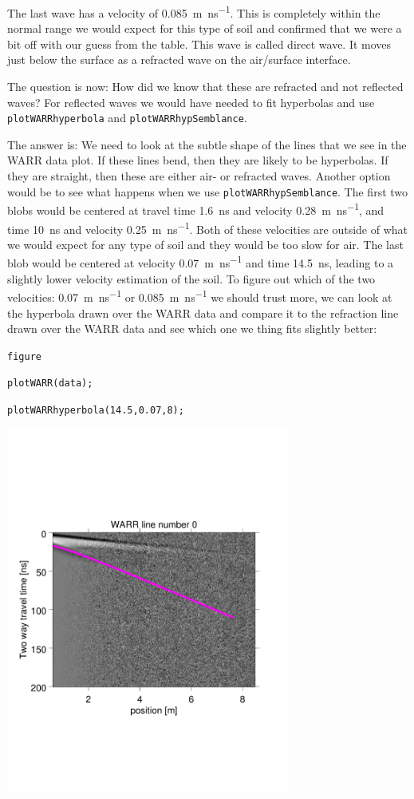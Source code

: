 \documentclass[11pt]{article}
\begin{document}
The last wave has a velocity of \SI{0.085}{m\per\ns}. This is
completely within the normal range we would expect for this type of
soil and confirmed that we were a bit off with our guess from the
table. This wave is called direct wave. It moves just below the
surface as a refracted wave on the air/surface interface.

The question is now: How did we know that these are refracted and not
reflected waves? For reflected waves we would have needed to fit
hyperbolas and use \verb#plotWARRhyperbola# and \linebreak
\verb#plotWARRhypSemblance#.

The answer is: We need to look at the subtle shape of the lines that
we see in the WARR data plot. If these lines bend, then they are
likely to be hyperbolas. If they are straight, then these are either
air- or refracted waves. Another option would be to see what happens
when we use \verb#plotWARRhypSemblance#.  The first two blobs would be
centered at travel time \SI{1.6}{\ns} and velocity
\SI{0.28}{m\per\ns}, and time \SI{10}{ns} and velocity
\SI{0.25}{m\per\ns}. Both of these velocities are outside of what we
would expect for any type of soil and they would be too slow for
air. The last blob would be centered at velocity \SI{0.07}{m\per\ns}
and time \SI{14.5}{\ns}, leading to a slightly lower velocity
estimation of the soil. To figure out which of the two velocities:
\SI{0.07}{m\per\ns} or \SI{0.085}{m\per\ns} we should trust more, we
can look at the hyperbola drawn over the WARR data and compare it to
the refraction line drawn over the WARR data and see which one we
thing fits slightly better:

\qquad \verb#figure#

\qquad \verb#plotWARR(data);#

\qquad \verb#plotWARRhyperbola(14.5,0.07,8);#

\begin{center}
  \includegraphics[width=0.7\textwidth,trim = 0.9cm 6cm 2cm
    6.5cm,clip]{figures/WARRhyperb}
\end{center}
\end{document}
